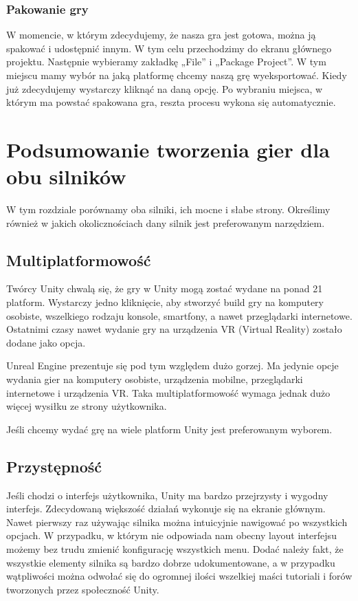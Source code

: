 \documentclass[12pt]{xmgr}
\begin{document}
\subsection{Pakowanie gry}

W momencie, w którym zdecydujemy, że nasza gra jest gotowa, można ją spakować i udostępnić innym. W tym celu przechodzimy do ekranu głównego projektu. Następnie wybieramy zakładkę „File” i „Package Project”. W tym miejscu mamy wybór na jaką platformę chcemy naszą grę wyeksportować. Kiedy już zdecydujemy wystarczy kliknąć na daną opcję. Po wybraniu miejsca, w którym ma powstać spakowana gra, reszta procesu wykona się automatycznie.

\chapter{Podsumowanie tworzenia gier dla obu silników}

W tym rozdziale porównamy  oba silniki, ich mocne i słabe strony. Określimy również w jakich okolicznościach dany silnik jest preferowanym narzędziem.

\section{Multiplatformowość}

Twórcy Unity chwalą się, że gry w Unity mogą zostać wydane na ponad 21 platform. Wystarczy jedno kliknięcie, aby stworzyć build gry na komputery osobiste, wszelkiego rodzaju konsole, smartfony, a nawet przeglądarki internetowe. Ostatnimi czasy nawet wydanie gry na urządzenia VR (Virtual Reality) zostało dodane jako opcja.

Unreal Engine prezentuje się pod tym względem dużo gorzej. Ma jedynie opcje wydania gier na komputery osobiste, urządzenia mobilne, przeglądarki internetowe i urządzenia VR. Taka multiplatformowość wymaga jednak dużo więcej wysiłku ze strony użytkownika.

Jeśli chcemy wydać grę na wiele platform Unity jest preferowanym wyborem.

\section{Przystępność}

Jeśli chodzi o interfejs użytkownika, Unity ma bardzo przejrzysty i wygodny interfejs. Zdecydowaną większość działań wykonuje się na ekranie głównym. Nawet pierwszy raz używając silnika można intuicyjnie nawigować po wszystkich opcjach.
W przypadku, w którym nie odpowiada nam obecny layout interfejsu możemy bez trudu zmienić konfigurację wszystkich menu.
Dodać należy fakt, że wszystkie elementy silnika są bardzo dobrze udokumentowane, a w przypadku wątpliwości można odwołać się do ogromnej ilości wszelkiej maści tutoriali i forów tworzonych przez społeczność Unity.
\end{document}
